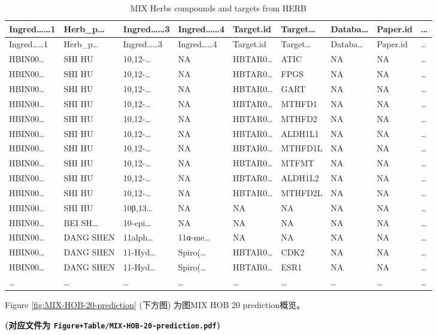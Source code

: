 \documentclass[
]{article}
\begin{document}
\begin{longtable}[]{@{}lllllllll@{}}
\caption{\label{tab:MIX-Herbs-compounds-and-targets-from-HERB}MIX Herbs compounds and targets from HERB}\tabularnewline
\toprule
Ingred\ldots\ldots1 & Herb\_p\ldots{} & Ingred\ldots\ldots3 & Ingred\ldots\ldots4 & Target.id & Target\ldots{} & Databa\ldots{} & Paper.id & \ldots{}\tabularnewline
\midrule
\endfirsthead
\toprule
Ingred\ldots\ldots1 & Herb\_p\ldots{} & Ingred\ldots\ldots3 & Ingred\ldots\ldots4 & Target.id & Target\ldots{} & Databa\ldots{} & Paper.id & \ldots{}\tabularnewline
\midrule
\endhead
HBIN00\ldots{} & SHI HU & 10,12-\ldots{} & NA & HBTAR0\ldots{} & ATIC & NA & NA & \ldots{}\tabularnewline
HBIN00\ldots{} & SHI HU & 10,12-\ldots{} & NA & HBTAR0\ldots{} & FPGS & NA & NA & \ldots{}\tabularnewline
HBIN00\ldots{} & SHI HU & 10,12-\ldots{} & NA & HBTAR0\ldots{} & GART & NA & NA & \ldots{}\tabularnewline
HBIN00\ldots{} & SHI HU & 10,12-\ldots{} & NA & HBTAR0\ldots{} & MTHFD1 & NA & NA & \ldots{}\tabularnewline
HBIN00\ldots{} & SHI HU & 10,12-\ldots{} & NA & HBTAR0\ldots{} & MTHFD2 & NA & NA & \ldots{}\tabularnewline
HBIN00\ldots{} & SHI HU & 10,12-\ldots{} & NA & HBTAR0\ldots{} & ALDH1L1 & NA & NA & \ldots{}\tabularnewline
HBIN00\ldots{} & SHI HU & 10,12-\ldots{} & NA & HBTAR0\ldots{} & MTHFD1L & NA & NA & \ldots{}\tabularnewline
HBIN00\ldots{} & SHI HU & 10,12-\ldots{} & NA & HBTAR0\ldots{} & MTFMT & NA & NA & \ldots{}\tabularnewline
HBIN00\ldots{} & SHI HU & 10,12-\ldots{} & NA & HBTAR0\ldots{} & ALDH1L2 & NA & NA & \ldots{}\tabularnewline
HBIN00\ldots{} & SHI HU & 10,12-\ldots{} & NA & HBTAR0\ldots{} & MTHFD2L & NA & NA & \ldots{}\tabularnewline
HBIN00\ldots{} & SHI HU & 10β,13\ldots{} & NA & NA & NA & NA & NA & \ldots{}\tabularnewline
HBIN00\ldots{} & BEI SH\ldots{} & 10-epi\ldots{} & NA & NA & NA & NA & NA & \ldots{}\tabularnewline
HBIN00\ldots{} & DANG SHEN & 11alph\ldots{} & 11α-me\ldots{} & NA & NA & NA & NA & \ldots{}\tabularnewline
HBIN00\ldots{} & DANG SHEN & 11-Hyd\ldots{} & Spiro(\ldots{} & HBTAR0\ldots{} & CDK2 & NA & NA & \ldots{}\tabularnewline
HBIN00\ldots{} & DANG SHEN & 11-Hyd\ldots{} & Spiro(\ldots{} & HBTAR0\ldots{} & ESR1 & NA & NA & \ldots{}\tabularnewline
\ldots{} & \ldots{} & \ldots{} & \ldots{} & \ldots{} & \ldots{} & \ldots{} & \ldots{} & \ldots{}\tabularnewline
\bottomrule
\end{longtable}

Figure \ref{fig:MIX-HOB-20-prediction} (下方图) 为图MIX HOB 20 prediction概览。

\textbf{(对应文件为 \texttt{Figure+Table/MIX-HOB-20-prediction.pdf})}
\end{document}
